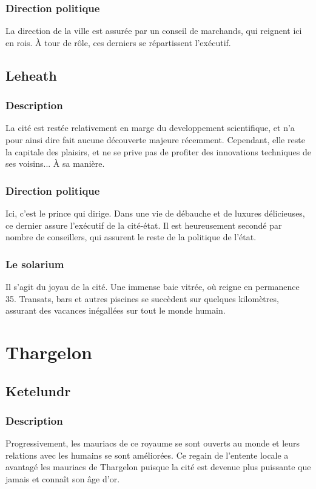 \subsubsection{Direction politique}
La direction de la ville est assurée par un conseil de marchands, qui reignent ici en rois. À tour de rôle, ces derniers se répartissent l'exécutif.
\subsection{Leheath}
\subsubsection{Description}
La cité est restée relativement en marge du developpement scientifique, et n'a pour ainsi dire fait aucune découverte majeure récemment. Cependant, elle reste la capitale des plaisirs, et ne se prive pas de profiter des innovations techniques de ses voisins... À sa manière.
\subsubsection{Direction politique}
Ici, c'est le prince qui dirige. Dans une vie de débauche et de luxures délicieuses, ce dernier assure l'exécutif de la cité-état. Il est heureusement secondé par nombre de conseillers, qui assurent le reste de la politique de l'état.
\subsubsection{Le solarium}
Il s'agit du joyau de la cité. Une immense baie vitrée, où reigne en permanence 35\degre. Transats, bars et autres piscines se succèdent sur quelques kilomètres, assurant des vacances inégallées sur tout le monde humain.
\section{Thargelon}
\subsection{Ketelundr}
\subsubsection{Description}
Progressivement, les mauriacs de ce royaume se sont ouverts au monde et leurs relations avec les humains se sont améliorées. Ce regain de l'entente locale a avantagé les mauriacs de Thargelon puisque la cité est devenue plus puissante que jamais et connaît son âge d'or.

